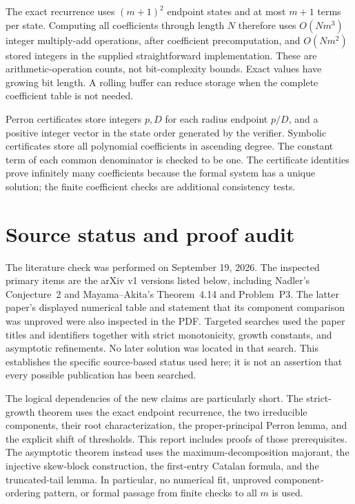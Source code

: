 \documentclass[11pt,a4paper]{article}
\theoremstyle{definition}\newaliascnt{definition}{theorem}
\theoremstyle{remark}\newaliascnt{remark}{theorem}
\begin{document}
The exact recurrence uses $(m+1)^2$ endpoint states and at most $m+1$
terms per state. Computing all coefficients through length $N$ therefore
uses $O(Nm^3)$ integer multiply-add operations, after coefficient
precomputation, and $O(Nm^2)$ stored integers in the supplied straightforward
implementation. These are arithmetic-operation counts, not bit-complexity
bounds. Exact values have growing bit length. A rolling buffer can reduce
storage when the complete coefficient table is not needed.

Perron certificates store integers $p,D$ for each radius endpoint $p/D$,
and a positive integer vector in the state order generated by the verifier.
Symbolic certificates store all polynomial coefficients in ascending degree.
The constant term of each common denominator is checked to be one.
The certificate identities prove infinitely many coefficients because the
formal system has a unique solution; the finite coefficient checks are
additional consistency tests.

\section{Source status and proof audit}
\label{app:status}
The literature check was performed on September 19, 2026. The inspected
primary items are the arXiv v1 versions listed below, including Nadler's
Conjecture~2 and Mayama--Akita's Theorem~4.14 and Problem~P3. The latter
paper's displayed numerical table and statement that its component comparison
was unproved were also inspected in the PDF. Targeted searches used the
paper titles and identifiers together with strict monotonicity, growth
constants, and asymptotic refinements. No later solution was located in
that search. This establishes the specific source-based status used here;
it is not an assertion that every possible publication has been searched.

The logical dependencies of the new claims are particularly short.
The strict-growth theorem uses the exact endpoint recurrence, the two
irreducible components, their root characterization, the proper-principal
Perron lemma, and the explicit shift of thresholds. This report includes
proofs of those prerequisites. The asymptotic theorem instead uses the
maximum-decomposition majorant, the injective skew-block construction,
the first-entry Catalan formula, and the truncated-tail lemma. In particular,
no numerical fit, unproved component-ordering pattern, or formal passage
from finite checks to all $m$ is used.
\end{document}
